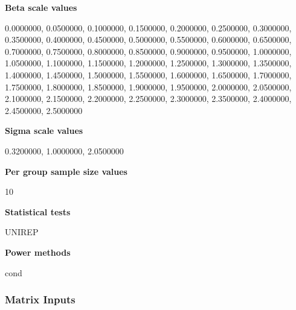 \documentclass{glimmpse-report}
\begin{document}
{\bf Beta scale values}

0.0000000, 0.0500000, 0.1000000, 0.1500000, 0.2000000, 0.2500000, 0.3000000, 0.3500000, 0.4000000, 0.4500000, 0.5000000, 0.5500000, 0.6000000, 0.6500000, 0.7000000, 0.7500000, 0.8000000, 0.8500000, 0.9000000, 0.9500000, 1.0000000, 1.0500000, 1.1000000, 1.1500000, 1.2000000, 1.2500000, 1.3000000, 1.3500000, 1.4000000, 1.4500000, 1.5000000, 1.5500000, 1.6000000, 1.6500000, 1.7000000, 1.7500000, 1.8000000, 1.8500000, 1.9000000, 1.9500000, 2.0000000, 2.0500000, 2.1000000, 2.1500000, 2.2000000, 2.2500000, 2.3000000, 2.3500000, 2.4000000, 2.4500000, 2.5000000

{\bf Sigma scale values}

0.3200000, 1.0000000, 2.0500000

{\bf Per group sample size values}

10

{\bf Statistical tests}

UNIREP

{\bf Power methods}

cond

\subsubsection{Matrix Inputs}
\end{document}
